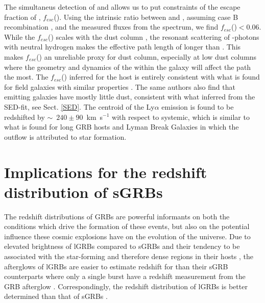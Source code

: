 \documentclass{aa}    %
\begin{document}
The simultaneus detection of \lya{} and \ha{} allows us to put constraints of
the escape fraction of \lya{}, $f_{esc}$(\lya). Using the intrinsic ratio
between \ha{} and \lya{}, assuming case B recombination
\citep{Brocklehurst1971}, and the measured fluxes from the spectrum, we find
$f_{esc}$(\lya)$ < 0.06$. While the $f_{esc}$(\lya) scales with the dust column
\citep{Hayes2011}, the resonant scattering of \lya{}-photons with neutral
hydrogen makes the effective path length of \lya{} longer than \ha{}
\citep{Atek2009}. This makes $f_{esc}$(\lya) an unreliable proxy for dust
column, especially at low dust columns \citep{Atek2014} where the geometry and
dynamics of the \hi{} within the galaxy will affect the \lya{} path the most.
The $f_{esc}$(\lya) inferred for the host is entirely consistent with what is
found for field galaxies with similar properties \citep{Oyarzun2017}. The same
authors also find that \lya{} emitting galaxies have mostly little dust,
consistent with what inferred from the SED-fit, see Sect. \ref{SED}. The
centroid of the Ly$\alpha$ emission is found to be redshifted by
$\sim$~$240\pm 90$~km~s$^{-1}$ with respect to systemic, which is similar to what is
found for long GRB hosts \citep{Milvang-Jensen2012a} and Lyman Break Galaxies
\citep{Shapley2003a} in which the outflow is attributed to star formation.



\section{Implications for the redshift distribution of sGRBs}


The redshift distributions of GRBs are powerful informants on both the
conditions which drive the formation of these events, but also on the potential
influence these cosmic explosions have on the evolution of the universe. Due to
elevated brightness of lGRBs compared to sGRBs \citep{Berger2014} and their
tendency to be associated with the star-forming and therefore dense regions in
their hosts \citep{Fruchter2006, Lyman2017}, the afterglows of lGRBs are easier
to estimate redshift for than their sGRB counterparts where only a single burst
have a redshift measurement from the GRB afterglow \citep{Cucchiara2013,
	DeUgartePostigo2014c}. Correspondingly, the redshift distribution of lGRBs is
better determined than that of sGRBs \citep[e.g., see][]{Jakobsson2012a,
	DAvanzo2015, Perley2016d}.
\end{document}
